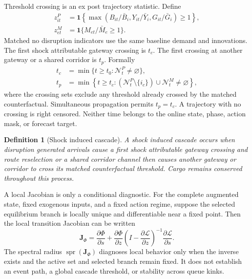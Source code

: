 \documentclass[a4paper,fleqn]{cas-sc}
\newcommand{\ind}{\mathbf{1}}           %
\newtheorem{definition}{Definition}
\begin{document}
Threshold crossing is an ex post trajectory statistic. Define
\begin{subequations}\label{eq:congestion-indicators}
\begin{align}
 z^P_{it}&=\ind\!\left\{
 \max(B_{it}/\bar B_i,Y_{it}/\bar Y_i,G_{it}/\bar G_i)\ge1
 \right\},\\
 z^M_{et}&=\ind\{M_{et}/\bar M_e\ge1\}.
\end{align}
\end{subequations}
Matched no disruption indicators use the same baseline demand and innovations.
The first shock attributable gateway crossing is $t_c$. The first crossing at
another gateway or a shared corridor is $t_p$. Formally
\begin{subequations}\label{eq:cascade-times}
\begin{align}
 t_c&=\min\{t\ge t_0:\mathcal N^P_t\ne\varnothing\},\\
 t_p&=\min\left\{t\ge t_c:
 (\mathcal N^P_t\setminus\{i_c\})\cup
 \mathcal N^M_t\ne\varnothing\right\},
\end{align}
\end{subequations}
where the crossing sets exclude any threshold already crossed by the matched
counterfactual. Simultaneous propagation permits $t_p=t_c$. A trajectory with
no crossing is right censored. Neither time belongs to the online state, phase,
action mask, or forecast target.

\begin{definition}[Shock induced cascade]
\label{def:cascade}
A shock induced cascade occurs when disruption generated arrivals cause a first
shock attributable gateway crossing and route reselection or a shared corridor
channel then causes another gateway or corridor to cross its matched
counterfactual threshold. Cargo remains conserved throughout this process.
\end{definition}

\par\medskip
A local Jacobian is only a conditional diagnostic. For the complete augmented
state, fixed exogenous inputs, and a fixed action regime, suppose the selected
equilibrium branch is locally unique and differentiable near a fixed point.
Then the local transition Jacobian can be written
\begin{equation}
 \mathbf J_\Phi=
 \frac{\partial\Phi}{\partial s}
 +\frac{\partial\Phi}{\partial z}
 \left(I-\frac{\partial\mathcal L}{\partial z}\right)^{-1}
 \frac{\partial\mathcal L}{\partial s}.
 \label{eq:local-jacobian}
\end{equation}
The spectral radius
$\operatorname{spr}(\mathbf J_\Phi)$ diagnoses local behavior only when the
inverse exists and the active set and selected branch remain fixed. It does not
establish an event path, a global cascade threshold, or stability across queue
kinks.
\end{document}
